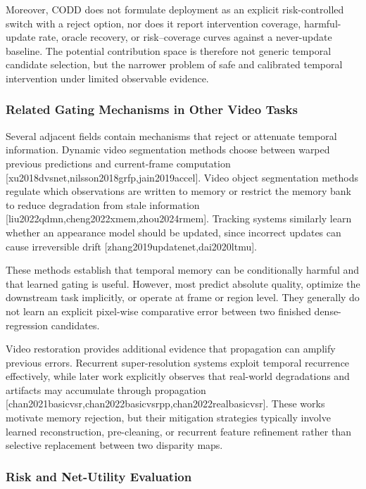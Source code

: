 \documentclass[11pt,a4paper]{article}
\providecommand{\citep}[1]{[#1]}
\begin{document}
Moreover, CODD does not formulate deployment as an explicit risk-controlled switch with a reject option, nor does it report intervention coverage, harmful-update rate, oracle recovery, or risk--coverage curves against a never-update baseline. The potential contribution space is therefore not generic temporal candidate selection, but the narrower problem of safe and calibrated temporal intervention under limited observable evidence.

\subsubsection{Related Gating Mechanisms in Other Video Tasks}

Several adjacent fields contain mechanisms that reject or attenuate temporal information. Dynamic video segmentation methods choose between warped previous predictions and current-frame computation \citep{xu2018dvsnet,nilsson2018grfp,jain2019accel}. Video object segmentation methods regulate which observations are written to memory or restrict the memory bank to reduce degradation from stale information \citep{liu2022qdmn,cheng2022xmem,zhou2024rmem}. Tracking systems similarly learn whether an appearance model should be updated, since incorrect updates can cause irreversible drift \citep{zhang2019updatenet,dai2020ltmu}.

These methods establish that temporal memory can be conditionally harmful and that learned gating is useful. However, most predict absolute quality, optimize the downstream task implicitly, or operate at frame or region level. They generally do not learn an explicit pixel-wise comparative error between two finished dense-regression candidates.

Video restoration provides additional evidence that propagation can amplify previous errors. Recurrent super-resolution systems exploit temporal recurrence effectively, while later work explicitly observes that real-world degradations and artifacts may accumulate through propagation \citep{chan2021basicvsr,chan2022basicvsrpp,chan2022realbasicvsr}. These works motivate memory rejection, but their mitigation strategies typically involve learned reconstruction, pre-cleaning, or recurrent feature refinement rather than selective replacement between two disparity maps.

\subsubsection{Risk and Net-Utility Evaluation}
\end{document}
